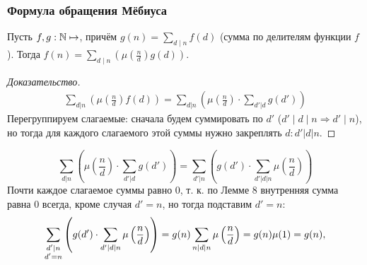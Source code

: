 

\begin{frame}[t]
    \frametitle{\normalsize \bf Формула обращения Мёбиуса}
    \setcounter{theorem}{19}

    \begin{theorem}[ФОМ]
        Пусть $f,g: \mathbb{N} \mapsto $, причём $g(n) = \sum\limits_{d \mid n} f(d)$ (сумма по делителям функции $f$). Тогда $f(n) = \sum\limits_{d \mid n} \left( \mu(\frac{n}{d}) g(d) \right) $.
    \end{theorem}

    \begin{proof}[Доказательство]
        \renewcommand{\qedsymbol}{}
        \begin{align*}
            \sum_{d | n} \left( \mu \left( \frac{n}{d} \right)  f(d) \right) = \sum_{d | n} \left( \mu\left(\frac{n}{d}\right) \cdot \sum_{d'| d}^{} g(d') \right) 
        \end{align*}
        Перегруппируем слагаемые: сначала будем суммировать по $d'$ ($d' \mid d \mid n \Rightarrow d' \mid n$), но тогда для каждого слагаемого этой суммы нужно закреплять $d: d' | d | n$. 
    \end{proof}
    
\end{frame}
\begin{frame}[t]
    \[
        \sum_{d | n} \left( \mu\left(\frac{n}{d}\right) \cdot \sum_{d'| d}^{} g(d') \right) = \sum_{d' | n}^{} \left( g(d') \cdot \sum_{d' | d | n}^{} \mu \left( \frac{n}{d} \right)  \right)
    \]
    Почти каждое слагаемое суммы равно 0, т. к. по Лемме 8 внутренняя сумма равна 0 всегда, кроме случая $d' = n$, но тогда подставим $d' = n$: \[
        \sum_{\substack{d' | n  \\ d' = n}}^{} \left( g(d') \cdot \sum_{d' | d | n}^{} \mu \left( \frac{n}{d} \right)  \right) = g(n) \sum_{n | d | n}^{} \mu \left( \frac{n}{d} \right) = g(n) \mu (1) = g(n), \qedsymbol
    \]
\end{frame}

